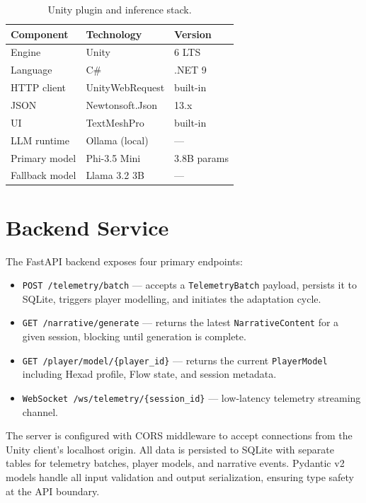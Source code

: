 \documentclass[12pt,a4paper]{report}
\begin{document}
\begin{table}[H]
\centering
\caption{Unity plugin and inference stack.}
\label{tab:unity_stack}
\small
\begin{tabular}{@{}lll@{}}
\toprule
\textbf{Component} & \textbf{Technology} & \textbf{Version} \\
\midrule
Engine & Unity & 6 LTS \\
Language & C\# & .NET 9 \\
HTTP client & UnityWebRequest & built-in \\
JSON & Newtonsoft.Json & 13.x \\
UI & TextMeshPro & built-in \\
\midrule
LLM runtime & Ollama (local) & --- \\
Primary model & Phi-3.5 Mini & 3.8B params \\
Fallback model & Llama 3.2 3B & --- \\
\bottomrule
\end{tabular}
\end{table}

\section{Backend Service}

The FastAPI backend exposes four primary endpoints:

\begin{itemize}
\item \texttt{POST /telemetry/batch} --- accepts a \texttt{TelemetryBatch} payload, persists it to SQLite, triggers player modelling, and initiates the adaptation cycle.
\item \texttt{GET /narrative/generate} --- returns the latest \texttt{NarrativeContent} for a given session, blocking until generation is complete.
\item \texttt{GET /player/model/\{player\_id\}} --- returns the current \texttt{PlayerModel} including Hexad profile, Flow state, and session metadata.
\item \texttt{WebSocket /ws/telemetry/\{session\_id\}} --- low-latency telemetry streaming channel.
\end{itemize}

The server is configured with CORS middleware to accept connections from the Unity client's localhost origin. All data is persisted to SQLite with separate tables for telemetry batches, player models, and narrative events. Pydantic v2 models handle all input validation and output serialization, ensuring type safety at the API boundary.
\end{document}
